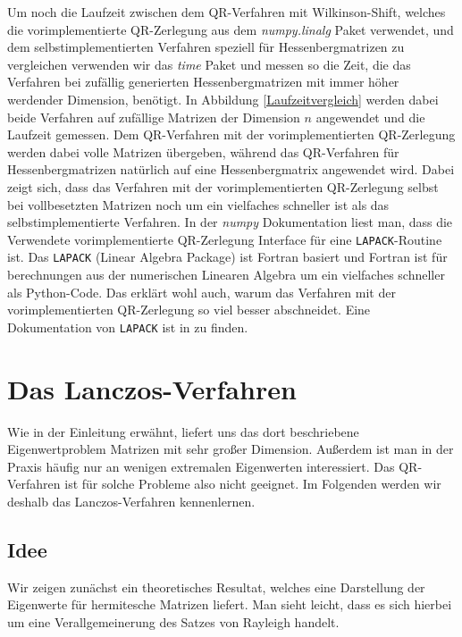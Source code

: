 \documentclass{article}
\theoremstyle{plain}
\begin{document}
Um noch die Laufzeit zwischen dem QR-Verfahren mit Wilkinson-Shift, welches die vorimplementierte QR-Zerlegung aus dem \textit{numpy.linalg} Paket verwendet, und dem selbstimplementierten Verfahren speziell für Hessenbergmatrizen zu vergleichen verwenden wir das \textit{time} Paket und messen so die Zeit, die das Verfahren bei zufällig generierten Hessenbergmatrizen mit immer höher werdender Dimension, benötigt. In Abbildung \ref{Laufzeitvergleich} werden dabei beide Verfahren auf zufällige Matrizen der Dimension $n$ angewendet und die Laufzeit gemessen. Dem QR-Verfahren mit der vorimplementierten QR-Zerlegung werden dabei volle Matrizen übergeben, während das QR-Verfahren für Hessenbergmatrizen natürlich auf eine Hessenbergmatrix angewendet wird. Dabei zeigt sich, dass das Verfahren mit der vorimplementierten QR-Zerlegung selbst bei vollbesetzten Matrizen noch um ein vielfaches schneller ist als das selbstimplementierte Verfahren. In der \textit{numpy} Dokumentation liest man, dass die Verwendete vorimplementierte QR-Zerlegung Interface für eine \texttt{LAPACK}-Routine ist. Das \texttt{LAPACK} (Linear Algebra Package) ist Fortran basiert und Fortran ist für berechnungen aus der numerischen Linearen Algebra um ein vielfaches schneller als Python-Code. Das erklärt wohl auch, warum das Verfahren mit der vorimplementierten QR-Zerlegung so viel besser abschneidet. Eine Dokumentation von \texttt{LAPACK} ist in \cite{LAPACK} zu finden.

\section{Das Lanczos-Verfahren}
Wie in der Einleitung erwähnt, liefert uns das dort beschriebene Eigenwertproblem Matrizen mit sehr großer Dimension. Außerdem ist man in der Praxis häufig nur an wenigen extremalen Eigenwerten interessiert. Das QR-Verfahren ist für solche Probleme also nicht geeignet. Im Folgenden werden wir deshalb das Lanczos-Verfahren kennenlernen.

\subsection{Idee}

Wir zeigen zunächst ein theoretisches Resultat, welches eine Darstellung der Eigenwerte für hermitesche Matrizen liefert. Man sieht leicht, dass es sich hierbei um eine Verallgemeinerung des Satzes von Rayleigh handelt.
\end{document}
